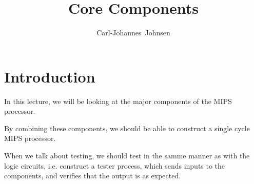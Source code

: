 \documentclass{beamer}
\title{Core Components}
\author[Carl-Johannes Johnsen]{
  \mbox{Carl-Johannes Johnsen}}
\institute{Department of Computer Science\\
           University of Copenhagen}
\begin{document}
\frame{\titlepage}


\section{Introduction}
\begin{frame}
    In this lecture, we will be looking at the major components of the MIPS
    processor.

    \vspace{\baselineskip}
    By combining these components, we should be able to construct a single
    cycle MIPS processor.

    \vspace{\baselineskip}
    When we talk about testing, we should test in the samme manner as with the
    logic circuits, i.e. construct a tester process, which sends inputs to the
    components, and verifies that the output is as expected.
\end{frame}
\end{document}
